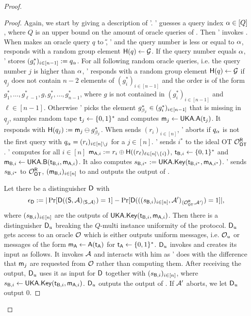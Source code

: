 \begin{proof}
\begin{proof}
Again, we start by giving a description of \Adv'. \Adv' guesses a query index $\alpha\in[Q]$, where $Q$ is an upper bound on the amount of oracle queries of \Adv. Then \Adv'  invokes \Adv.
When \Adv makes an oracle query $q$ to \H, \Adv' and the query number is less or equal to $\alpha$, \Adv responds with a random group element $\mathsf{H}(q)\leftarrow\mathcal{G}$. 
If the query number equals $\alpha$, \Adv' stores $(g^*_i)_{i\in[n-1]}:=q_{\alpha}$. 
For all following random oracle queries, i.e. the query number $j$ is higher than $\alpha$, \Adv ' responds with a random group element $\mathsf{H}(q)\leftarrow\mathcal{G}$ if $q_j$ does not contain $n-2$ elements of $(g^*_i)_{i\in[n-1]}$  and the order is of the form $g^*_1,\dots, g^*_{\ell-1},g,g^*_{\ell},\dots, g^*_{n-1}$, where $g$ is not contained in $(g^*_i)_{i\in[n-1]}$ and $\ell\in[n-1]$. Otherwise \Adv' picks the element $g^*_{\beta_j}\in(g^*_i)_{i\in[n-1]}$ that is missing in $q_j$,  samples random tape $\mathsf{t}_j\leftarrow\{0,1\}^*$ and computes $\mathsf{m}_{j}\leftarrow\mathsf{UKA}.\mathsf{A}(\mathsf{t}_j)$. 
It responds with $\mathsf{H}(q_j):=\mathsf{m}_j\ominus g^*_{\beta_j}$. When \Adv sends $(r_i)_{i\in[n]}$, \Adv' aborts if $q_{\alpha}$ is not the first query with $q_{\alpha}=(r_i)_{i\in[n]\setminus{j}}$ for a $j\in[n]$. \Adv' sends $i^*$ to the ideal OT $\mathcal{O}_{\mathsf{OT}}^{\mathsf{R}}$. \Adv' computes for all $i\in[n]$ $\mathsf{m}_{\mathsf{A},i}:=r_i\oplus\mathsf{H}((r_\ell)_{\ell\in[n]\setminus\{i\}})$, $\mathsf{t}_{\mathsf{B},i}\leftarrow\{0,1\}^*$ and $\mathsf{m}_{\mathsf{B},i}\leftarrow\mathsf{UKA}.\mathsf{B}(\mathsf{t}_{\mathsf{B},i},\mathsf{m}_{\mathsf{A},i})$. It also computes $s_{\mathsf{B},i^*}:=\mathsf{UKA}.\mathsf{Key}(\mathsf{t}_{\mathsf{B},i^*},\mathsf{m}_{\mathsf{A},i^*})$.
\Adv' sends $s_{\mathsf{B},i^*}$ to $\mathcal{O}_{\mathsf{OT}}^{\mathsf{R}}$, $(\mathsf{m}_{\mathsf{B},i})_{i\in[n]}$ to \Adv and outputs the output of \Adv.

Let there be a distinguisher $\mathsf D$ with
$$
\epsilon_{\mathsf D}:=|\Pr[\mathsf D((\mathsf{S}, \mathcal{A})_{\langle \mathsf{S}, \mathcal{A}\rangle})=1] -\Pr[\mathsf D(((s_{\mathsf{B},i})_{i\in[n]},\mathcal{A}')_{\langle \mathcal{O}_{\mathsf{OT}}^\mathsf{R} , \mathcal{A}' \rangle})=1]|,
$$
where $(s_{\mathsf{B},i})_{i\in[n]}$ are the outputs of $\mathsf{UKA}.\mathsf{Key}(\mathsf{t}_{\mathsf{B},i},\mathsf{m}_{\mathsf{A},i})$. Then there is a distinguisher $\mathsf D_u$ breaking the $Q$-multi instance uniformity of the \UKA protocol. $\mathsf D_u$ gets access to an oracle $\mathcal{O}$ which is either outputs uniform messages, i.e. $\mathcal{O}_u$ or messages of  the form $\mathsf{m}_\mathsf{A}\leftarrow\mathsf{A}(\mathsf{t}_\mathsf{A})$ for $\mathsf{t}_\mathsf{A}\leftarrow\{0,1\}^*$. $\mathsf D_u$ invokes \D and creates its input as follows. It invokes $\mathcal{A}$ and interacts with him as \Adv' does with the difference that $\mathsf{m}_j$ are requested from $\mathcal{O}$ rather than computing them.  After receiving the output, $\mathsf D_u$ uses it as input for $\mathsf D$ together with $(s_{\mathsf{B},i})_{i\in[n]}$, where $s_{\mathsf{B},i}\leftarrow\mathsf{UKA}.\mathsf{Key}(\mathsf{t}_{\mathsf{B},i},\mathsf{m}_{\mathsf{A},i})$. $\mathsf D_u$ outputs the output of \D. If $\mathcal{A}'$ aborts, we let $\mathsf D_u$ output $0$.


\end{proof}
\end{proof}
